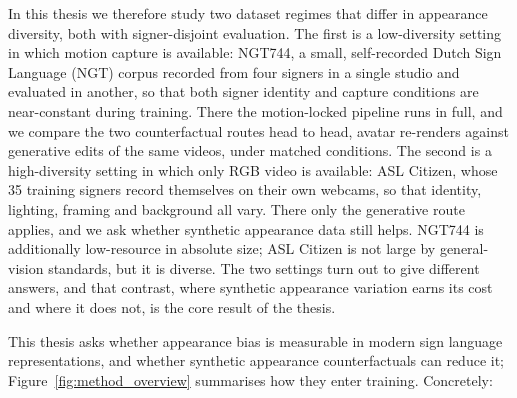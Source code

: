 In this thesis we therefore study two dataset regimes that differ in
appearance diversity, both with signer-disjoint evaluation. The first is
a low-diversity setting in which motion capture is available: NGT744, a
small, self-recorded Dutch Sign Language (NGT) corpus recorded from four
signers in a single studio and evaluated in another, so that both signer
identity and capture conditions are near-constant during training. There
the motion-locked pipeline runs in full, and we compare the two
counterfactual routes head to head, avatar re-renders against generative
edits of the same videos, under matched conditions. The second is a
high-diversity setting in which only RGB video is available: ASL Citizen,
whose 35 training signers record themselves on their own webcams, so that
identity, lighting, framing and background all vary. There only the
generative route applies, and we ask whether synthetic appearance data
still helps. NGT744 is additionally low-resource in absolute size; ASL
Citizen is not large by general-vision standards, but it is diverse. The
two settings turn out to give different answers, and that contrast, where
synthetic appearance variation earns its cost and where it does not, is
the core result of the thesis.

This thesis asks whether appearance bias is measurable in modern sign
language representations, and whether synthetic appearance
counterfactuals can reduce it; Figure~\ref{fig:method_overview}
summarises how they enter training. Concretely:

